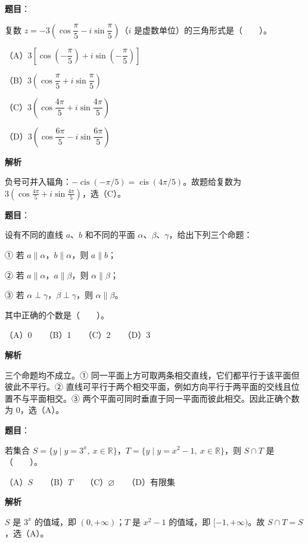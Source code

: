 \begin{answer}

\textbf{题目}：

复数 $z=-3\left(\cos\dfrac{\pi}{5}-i\sin\dfrac{\pi}{5}\right)$（$i$ 是虚数单位）的三角形式是\mbox{（　　）}。

（A）$3\left[\cos\left(-\dfrac{\pi}{5}\right)+i\sin\left(-\dfrac{\pi}{5}\right)\right]$

（B）$3\left(\cos\dfrac{\pi}{5}+i\sin\dfrac{\pi}{5}\right)$

（C）$3\left(\cos\dfrac{4\pi}{5}+i\sin\dfrac{4\pi}{5}\right)$

（D）$3\left(\cos\dfrac{6\pi}{5}-i\sin\dfrac{6\pi}{5}\right)$

\textbf{解析}

负号可并入辐角：$-\operatorname{cis}(-\pi/5)=\operatorname{cis}(4\pi/5)$。故题给复数为 $3(\cos\frac{4\pi}5+i\sin\frac{4\pi}5)$，选（C）。


\end{answer}
\begin{answer}

\textbf{题目}：

设有不同的直线 $a$、$b$ 和不同的平面 $\alpha$、$\beta$、$\gamma$，给出下列三个命题：

① 若 $a\parallel\alpha$，$b\parallel\alpha$，则 $a\parallel b$；

② 若 $a\parallel\alpha$，$a\parallel\beta$，则 $\alpha\parallel\beta$；

③ 若 $\alpha\perp\gamma$，$\beta\perp\gamma$，则 $\alpha\parallel\beta$。

其中正确的个数是\mbox{（　　）}。

（A）0　　（B）1　　（C）2　　（D）3

\textbf{解析}

三个命题均不成立。① 同一平面上方可取两条相交直线，它们都平行于该平面但彼此不平行。② 直线可平行于两个相交平面，例如方向平行于两平面的交线且位置不与平面相交。③ 两个平面可同时垂直于同一平面而彼此相交。因此正确个数为 $0$，选（A）。


\end{answer}
\begin{answer}

\textbf{题目}：

若集合 $S=\{y\mid y=3^x,\ x\in\mathbb{R}\}$，$T=\{y\mid y=x^2-1,\ x\in\mathbb{R}\}$，则 $S\cap T$ 是\mbox{（　　）}。

（A）$S$　　（B）$T$　　（C）$\varnothing$　　（D）有限集

\textbf{解析}

$S$ 是 $3^x$ 的值域，即 $(0,+\infty)$；$T$ 是 $x^2-1$ 的值域，即 $[-1,+\infty)$。故 $S\cap T=S$，选（A）。


\end{answer}
